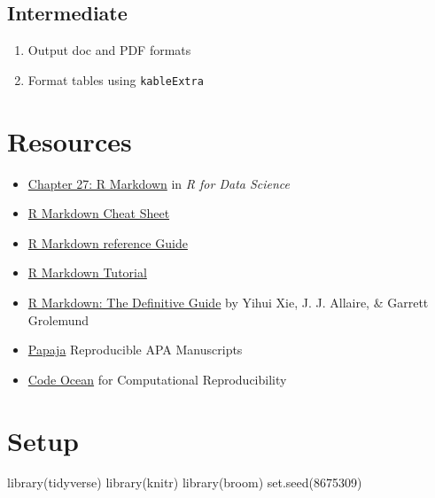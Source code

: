 \documentclass[
  oneside]{book}
\newenvironment{Shaded}{\begin{snugshade}}{\end{snugshade}}
\newcommand{\DecValTok}[1]{\textcolor[rgb]{0.00,0.00,0.81}{#1}}
\newcommand{\FunctionTok}[1]{\textcolor[rgb]{0.00,0.00,0.00}{#1}}
\newcommand{\NormalTok}[1]{#1}
\providecommand{\tightlist}{%
  \setlength{\itemsep}{0pt}\setlength{\parskip}{0pt}}
\begin{document}
\hypertarget{intermediate}{%
\subsection{Intermediate}\label{intermediate}}

\begin{enumerate}
\def\labelenumi{\arabic{enumi}.}
\setcounter{enumi}{7}
\tightlist
\item
  Output doc and PDF formats
\item
  Format tables using \texttt{kableExtra}
\end{enumerate}

\hypertarget{resources-repro}{%
\section{Resources}\label{resources-repro}}

\begin{itemize}
\tightlist
\item
  \href{http://r4ds.had.co.nz/r-markdown.html}{Chapter 27: R Markdown} in \emph{R for Data Science}
\item
  \href{http://www.rstudio.com/wp-content/uploads/2016/03/rmarkdown-cheatsheet-2.0.pdf}{R Markdown Cheat Sheet}
\item
  \href{https://www.rstudio.com/wp-content/uploads/2015/03/rmarkdown-reference.pdf}{R Markdown reference Guide}
\item
  \href{https://rmarkdown.rstudio.com/lesson-1.html}{R Markdown Tutorial}
\item
  \href{https://bookdown.org/yihui/rmarkdown/}{R Markdown: The Definitive Guide} by Yihui Xie, J. J. Allaire, \& Garrett Grolemund
\item
  \href{https://crsh.github.io/papaja_man/}{Papaja} Reproducible APA Manuscripts
\item
  \href{https://codeocean.com/}{Code Ocean} for Computational Reproducibility
\end{itemize}

\hypertarget{setup-repro}{%
\section{Setup}\label{setup-repro}}

\begin{Shaded}
\begin{Highlighting}[]
\FunctionTok{library}\NormalTok{(tidyverse)}
\FunctionTok{library}\NormalTok{(knitr)}
\FunctionTok{library}\NormalTok{(broom)}
\FunctionTok{set.seed}\NormalTok{(}\DecValTok{8675309}\NormalTok{)}
\end{Highlighting}
\end{Shaded}
\end{document}
